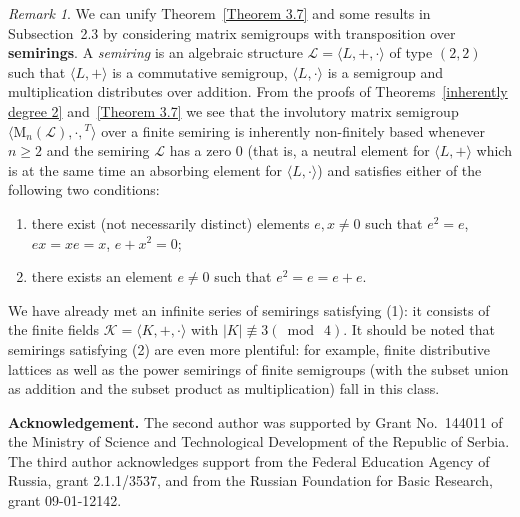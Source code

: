 \documentclass[11pt,reqno]{amsart}
\numberwithin{equation}{section}
\theoremstyle{remark}
\newtheorem{Rmk}{Remark}[section]
\begin{document}
\begin{Rmk}
We can unify Theorem~\ref{Theorem 3.7} and some results in
Subsection~2.3 by considering matrix semigroups with transposition
over \textbf{semirings}. A \emph{semiring} is an algebraic
structure $\mathcal{L}=\langle L,+,\cdot\rangle$ of type $(2,2)$
such that $\langle L,+\rangle$ is a commutative semigroup,
$\langle L,\cdot\rangle$ is a semigroup and multiplication
distributes over addition. From the proofs of
Theorems~\ref{inherently degree 2} and~\ref{Theorem 3.7} we see
that the involutory matrix semigroup
$\langle\mathrm{M}_n(\mathcal{L}),\cdot,{}^T\rangle$ over a finite
semiring is inherently non-finitely based whenever $n\ge 2$ and
the semiring $\mathcal{L}$ has a zero 0 (that is, a neutral
element for $\langle L,+\rangle$ which is at the same time an
absorbing element for $\langle L,\cdot\rangle$) and satisfies
either of the following two conditions:
\begin{enumerate}
\item there exist (not necessarily distinct) elements $e,x\ne 0$
such that $e^2=e$, $ex=xe=x$, $e+x^2=0$;
\item there exists an element $e\ne 0$ such that $e^2=e=e+e$.
\end{enumerate}
We have already met an infinite series of semirings satisfying
(1): it consists of the finite fields $\mathcal{K}=\langle
K,+,\cdot\rangle$ with $\vert K\vert\mathrel{\not\equiv 3}(\bmod\
4)$. It should be noted that semirings satisfying (2) are even
more plentiful: for example, finite distributive lattices as well
as the power semirings of finite semigroups (with the subset union
as addition and the subset product as multiplication) fall in this
class.
\end{Rmk}

\noindent\textbf{Acknowledgement.} The second author was supported
by Grant No.\ 144011 of the Ministry of Science and Technological
Development of the Republic of Serbia. The third author
acknowledges support from the Federal Education Agency of Russia,
grant 2.1.1/3537, and from the Russian Foundation for Basic
Research, grant 09-01-12142.
\end{document}
